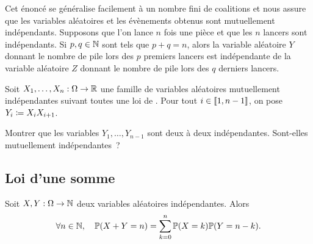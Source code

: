 \documentclass{magnolia}
\begin{document}
\begin{remarques}
\remarque Cet énoncé se généralise facilement à un nombre fini de coalitions et nous
  assure que les variables aléatoires et les évènements obtenus sont mutuellement
  indépendants.
\remarque Supposons que l'on lance $n$ fois une pièce et que les $n$ lancers sont
  indépendants. Si $p,q\in\mathbb{N}$ sont tels que $p+q=n$, alors la variable aléatoire $Y$
  donnant le nombre de pile lors des $p$ premiers lancers est indépendante de la
  variable aléatoire $Z$ donnant le nombre de pile lors des $q$ derniers lancers.
\end{remarques}

\begin{exoUnique}
\exo Soit $X_1,\ldots,X_n:\Omega\to\mathbb{R}$ une famille de variables aléatoires mutuellement
  indépendantes suivant toutes une loi de . Pour tout $i\in\left\llbracket 1,n-1\right\rrbracket$,
  on pose $Y_i\coloneqq X_i X_{i+1}$.
  \begin{questions}
  \question Montrer que les variables $Y_1,\ldots,Y_{n-1}$ sont deux à deux indépendantes.
  \question Sont-elles mutuellement indépendantes~?
  \end{questions}
\end{exoUnique}



\subsection{Loi d'une somme}

\begin{proposition}
Soit $X,Y:\Omega\to\mathbb{N}$ deux variables aléatoires indépendantes. Alors
\[\forall n\in\mathbb{N},\quad\mathbb{P}(X+Y=n)=\sum_{k=0}^n  \mathbb{P}(X=k) \mathbb{P}(Y=n-k).\]
\end{proposition}
\end{document}

